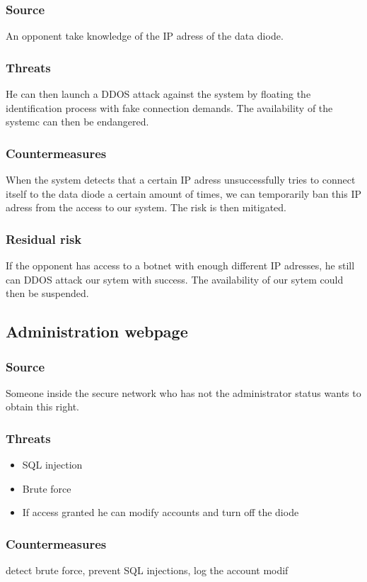 \documentclass[a4paper,11pt]{article}
\begin{document}
\subsubsection{Source}
An opponent take knowledge of the IP adress of the data diode.
\subsubsection{Threats}
He can then launch a DDOS attack against the system by floating the identification process with fake connection demands. The availability of the systemc can then be endangered.
\subsubsection{Countermeasures}
When the system detects that a certain IP adress unsuccessfully tries to connect itself to the data diode a certain amount of times, we can temporarily ban this IP adress from the access to our system.  The risk is then mitigated.
\subsubsection{Residual risk}
If the opponent has access to a botnet with enough different IP adresses, he still can DDOS attack our sytem with success. The availability of our sytem could then be suspended.
\subsection{Administration webpage}
\subsubsection{Source}
Someone inside the secure network who has not the administrator status wants to obtain this right.
\subsubsection{Threats}
\begin{itemize}
\item SQL injection
\item Brute force
\item If access granted he can modify accounts and turn off the diode
\end{itemize}
\subsubsection{Countermeasures}
detect brute force, prevent SQL injections, log the account modif
\end{document}
